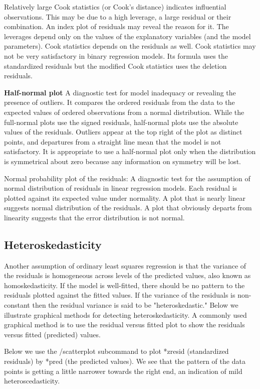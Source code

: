 Relatively large Cook statistics (or Cook's distance) indicates influential observations. This may be due to a high leverage, a large residual or their combination. An index plot of residuals may reveal the reason for it. The leverages depend only on the values of the explanatory variables (and the model parameters). Cook statistics depends on the residuals as well. Cook statistics may not be very satisfactory in binary regression models. Its formula uses the standardized residuals but the modified Cook statistics uses the deletion residuals.

\textbf{Half-normal plot} A diagnostic test for model inadequacy or revealing the presence of outliers. It compares the ordered residuals from the data to the expected values of ordered observations from a normal distribution. While the full-normal plots use the signed residuals, half-normal plots use the absolute values of the residuals. Outliers appear at the top right of the plot as distinct points, and departures from a straight line mean that the model is not satisfactory. It is appropriate to use a half-normal plot only when the distribution is symmetrical about zero because any information on symmetry will be lost.

Normal probability plot of the residuals: A diagnostic test for the assumption of normal distribution of residuals in linear regression models. Each residual is plotted against its expected value under normality. A plot that is nearly linear suggests normal distribution of the residuals. A plot that obviously departs from linearity suggests that the error distribution is not normal.

\subsection{Heteroskedasticity}

Another assumption of ordinary least squares regression is that the variance of the residuals is homogeneous across levels of the predicted values, also known as homoskedasticity. If the model is well-fitted, there should be no pattern to the residuals plotted against the fitted values. If the variance of the residuals is non-constant then the residual variance is said to be "heteroskedastic." Below we illustrate graphical methods for detecting heteroskedasticity. A commonly used graphical method is to use the residual versus fitted plot to show the residuals versus fitted (predicted) values.

Below we use the /scatterplot subcommand to plot *zresid (standardized residuals) by *pred (the predicted values).  We see that the pattern of the data points is getting a little narrower towards the right end, an indication of mild heteroscedasticity.

